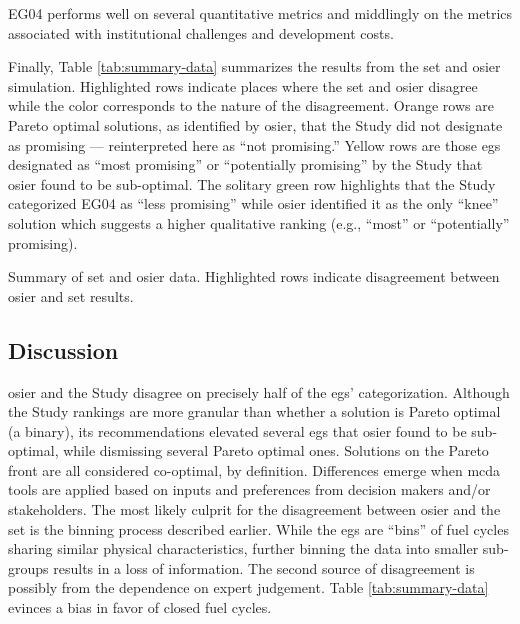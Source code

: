 \noindent
EG04 performs well on several quantitative metrics and middlingly on the metrics associated 
with institutional challenges and development costs.

\FloatBarrier

\noindent
Finally, Table \ref{tab:summary-data} summarizes the results from the \ac{set} and
\ac{osier} simulation. Highlighted rows indicate places where the \ac{set} and \ac{osier}
disagree while the color corresponds to the nature of the disagreement. Orange rows are
Pareto optimal solutions, as identified by \ac{osier}, that the Study did not designate as promising ---
reinterpreted here as ``not promising.'' Yellow rows are those \acp{eg} designated as ``most promising''
or ``potentially promising'' by the Study that \ac{osier} found to be sub-optimal. The solitary green row
highlights that the Study categorized EG04 as ``less promising'' while \ac{osier} identified it as the 
only ``knee'' solution which suggests a higher qualitative ranking (e.g., ``most'' or ``potentially'' promising). 

\begin{table}[htbp!]
    \centering
    \caption{Summary of \ac{set} and \ac{osier} data. Highlighted rows indicate
    disagreement between \ac{osier} and \ac{set} results.}
    \label{tab:summary-data}
    \resizebox*{0.75\textwidth}{!}{}
\end{table}

\FloatBarrier

\subsection{Discussion}

\ac{osier} and the Study disagree on precisely half of the \acp{eg}' categorization. Although the
Study rankings are more granular than whether a solution is Pareto optimal (a binary), its recommendations
elevated several \acp{eg} that \ac{osier} found to be sub-optimal, while dismissing several Pareto optimal
ones. Solutions on the Pareto front are all considered co-optimal, by definition. Differences emerge when 
\ac{mcda} tools are applied based on inputs and preferences from decision makers and/or stakeholders.
The most likely culprit for the disagreement between \ac{osier} and the \ac{set} is the binning process
described earlier. While the \acp{eg} are ``bins'' of fuel cycles sharing similar physical characteristics,
further binning the data into smaller sub-groups results in a loss of information. The second source of disagreement
is possibly from the dependence on expert judgement. Table \ref{tab:summary-data} evinces a bias in favor of closed
fuel cycles.

